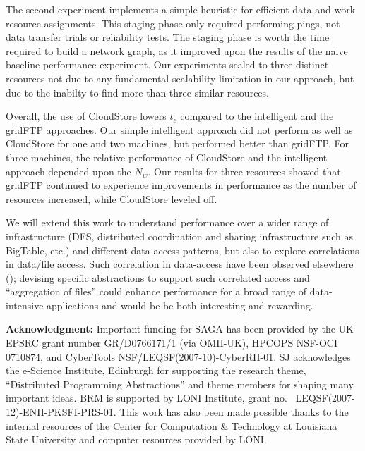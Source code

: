 \documentclass{rspublic}
\begin{document}
The second experiment implements a simple heuristic for efficient data
and work resource assignments.  This staging phase only required
performing pings, not data transfer trials or reliability tests.  The
staging phase is worth the time required to build a network graph, as
it improved upon the results of the naive baseline performance
experiment. Our experiments scaled to three distinct resources not due
to any fundamental scalability limitation in our approach, but due to
the inabilty to find more than three similar resources.
 
Overall, the use of CloudStore lowers $t_c$ compared to the
intelligent and the gridFTP approaches. Our simple intelligent
approach did not perform as well as CloudStore for one and two
machines, but performed better than gridFTP.  For three machines, the
relative performance of CloudStore and the intelligent approach
depended upon the $N_w$.  Our results for three resources showed that
gridFTP continued to experience improvements in performance as the
number of resources increased, while CloudStore leveled off.  

We will extend this work to understand performance over a wider range
of infrastructure (DFS, distributed coordination and sharing
infrastructure such as BigTable, etc.) and different data-access
patterns, but also to explore correlations in data/file access.  Such
correlation in data-access have been observed elsewhere
(\cite{filecule}); devising specific abstractions to support such
correlated access and ``aggregation of files'' could enhance
performance for a broad range of data-intensive applications and would
be be both interesting and rewarding.

{\bf Acknowledgment:} Important funding for SAGA has been provided by
the UK EPSRC grant number GR/D0766171/1 (via OMII-UK), HPCOPS
NSF-OCI 0710874, and CyberTools NSF/LEQSF(2007-10)-CyberRII-01.
 SJ acknowledges the e-Science Institute, Edinburgh
for supporting the research theme, ``Distributed Programming
Abstractions'' and theme members for shaping many important ideas. BRM
is supported by LONI Institute, grant no. \
LEQSF(2007-12)-ENH-PKSFI-PRS-01. This work has also been made possible
thanks to the internal resources of the Center for Computation \&
Technology at Louisiana State University and computer resources
provided by LONI.

\vspace{-0.4cm}


%
 

\end{document}
